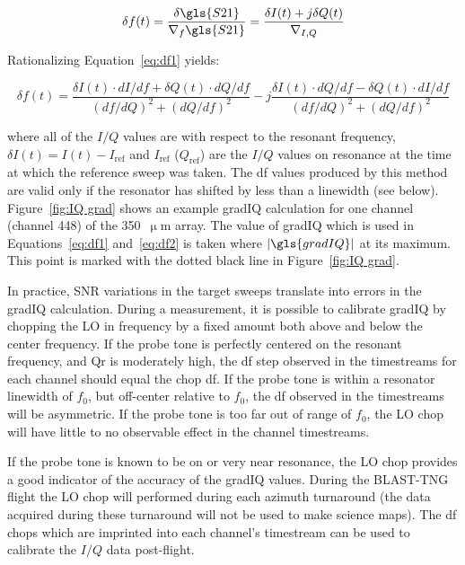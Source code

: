 \begin{equation}\label{eq:df1}
   \delta f(t) = \frac{\delta \gls{S21}}{\nabla_{f}\gls{S21}} = \frac{\delta I(t) + j\delta Q(t)}{\nabla_{I,Q}}
\end{equation}

Rationalizing Equation~\ref{eq:df1} yields:

\begin{equation}\label{eq:df2}
    \delta f(t) = \frac{\delta I(t) \cdot dI/df + \delta Q(t) \cdot dQ/df}{(df/dQ)^{2} + (dQ/df)^{2}} - j\frac{\delta I(t) \cdot dQ/df - \delta Q(t) \cdot dI/df}{(df/dQ)^{2} + (dQ/df)^{2}}
\end{equation}

where all of the $I/Q$ values are with respect to the resonant frequency, $\delta I(t) = I(t) - I_{\mathrm{ref}}$ and $I_{\mathrm{ref}}$ ($Q_{\mathrm{ref}}$) are the $I/Q$ values on resonance at the time at which the reference sweep was taken. The \gls{df} values produced by this method are valid only if the resonator has shifted by less than a linewidth (see below). Figure~\ref{fig:IQ grad} shows an example \gls{gradIQ} calculation for one channel (channel 448) of the 350~$\upmu$m array. The value of \gls{gradIQ} which is used in Equations~\ref{eq:df1} and~\ref{eq:df2} is taken where $\left| \gls{gradIQ} \right|$ at its maximum. This point is marked with the dotted black line in Figure~\ref{fig:IQ grad}.

In practice, SNR variations in the target sweeps translate into errors in the \gls{gradIQ} calculation. During a measurement, it is possible to calibrate \gls{gradIQ} by chopping the LO in frequency by a fixed amount both above and below the center frequency. If the probe tone is perfectly centered on the resonant frequency, and \gls{Qr} is moderately high, the \gls{df} step observed in the timestreams for each channel should equal the chop \gls{df}. If the probe tone is within a resonator linewidth of $f_{0}$, but off-center relative to $f_{0}$, the \gls{df} observed in the timestreams will be asymmetric. If the probe tone is too far out of range of $f_{0}$, the LO chop will have little to no observable effect in the channel timestreams.

If the probe tone is known to be on or very near resonance, the LO chop provides a good indicator of the accuracy of the \gls{gradIQ} values. During the BLAST-TNG flight the LO chop will performed during each azimuth turnaround (the data acquired during these turnaround will not be used to make science maps). The \gls{df} chops which are imprinted into each channel's timestream can be used to calibrate the $I/Q$ data post-flight.

